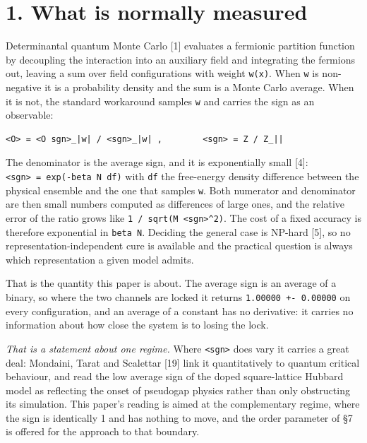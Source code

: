 \documentclass[10pt,letterpaper,twocolumn]{article}
\begin{document}
\section{1. What is normally measured}\label{1-what-is-normally-measured}

Determinantal quantum Monte Carlo {[}1{]} evaluates a fermionic partition function by decoupling the
interaction into an auxiliary field and integrating the fermions out, leaving a sum over field
configurations with weight \texttt{w(\allowbreak{}x)\allowbreak{}}. When \texttt{w} is non-negative it is a probability density and the
sum is a Monte Carlo average. When it is not, the standard workaround samples \texttt{\textbar{}\allowbreak{}w\textbar{}\allowbreak{}} and carries
the sign as an observable:

\begin{verbatim}
<O> = <O sgn>_|w| / <sgn>_|w| ,        <sgn> = Z / Z_||
\end{verbatim}

The denominator is the average sign, and it is exponentially small {[}4{]}:
\texttt{\textless{}\allowbreak{}sgn\textgreater{}\allowbreak{}\ =\allowbreak{}\ exp(\allowbreak{}-{}\allowbreak{}beta\ N\ df)\allowbreak{}} with \texttt{df} the free-energy density difference between the physical
ensemble and the one that samples \texttt{\textbar{}\allowbreak{}w\textbar{}\allowbreak{}}. Both numerator and denominator are then small numbers
computed as differences of large ones, and the relative error of the ratio grows like
\texttt{1\ /\allowbreak{}\ sqrt(\allowbreak{}M\ \textless{}\allowbreak{}sgn\textgreater{}\allowbreak{}\^{}2)\allowbreak{}}. The cost of a fixed
accuracy is therefore exponential in \texttt{beta\ N}. Deciding the general case is NP-hard {[}5{]}, so no
represen\allowbreak{}tation-\allowbreak{}independ\allowbreak{}ent cure is available and the practical question is always which
representation a given model admits.

That is the quantity this paper is about. The average sign is an average of a binary, so where the
two channels are locked it returns \texttt{1.\allowbreak{}00000\ +\allowbreak{}-{}\allowbreak{}\ 0.\allowbreak{}00000} on every configuration, and an average of a
constant has no derivative: it carries no information about how close the system is to losing the
lock.

\emph{That is a statement about one regime.} Where \texttt{\textless{}\allowbreak{}sgn\textgreater{}\allowbreak{}} does vary it carries a great deal: Mondaini,
Tarat and Scalettar {[}19{]} link it quantitatively to quantum critical behaviour, and read the low
average sign of the doped square-lattice Hubbard model as reflecting the onset of pseudogap physics
rather than only obstructing its simulation. This paper's reading is aimed at the complementary
regime, where the sign is identically 1 and has nothing to move, and the order parameter of §7 is
offered for the approach to that boundary.
\end{document}
